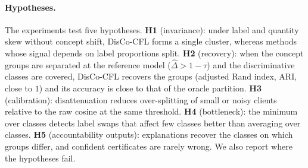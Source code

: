 \documentclass[11pt]{article}
\theoremstyle{definition}
\theoremstyle{remark}
\begin{document}
\paragraph{Hypotheses.} The experiments test five hypotheses. \textbf{H1} (invariance): under label and quantity skew without concept shift, DisCo-CFL forms a single cluster, whereas methods whose signal depends on label proportions split. \textbf{H2} (recovery): when the concept groups are separated at the reference model ($\hat\Delta>1-\tau$) and the discriminative classes are covered, DisCo-CFL recovers the groups (adjusted Rand index, ARI, close to $1$) and its accuracy is close to that of the oracle partition. \textbf{H3} (calibration): disattenuation reduces over-splitting of small or noisy clients relative to the raw cosine at the same threshold. \textbf{H4} (bottleneck): the minimum over classes detects label swaps that affect few classes better than averaging over classes. \textbf{H5} (accountability outputs): explanations recover the classes on which groups differ, and confident certificates are rarely wrong. We also report where the hypotheses fail.
\end{document}
